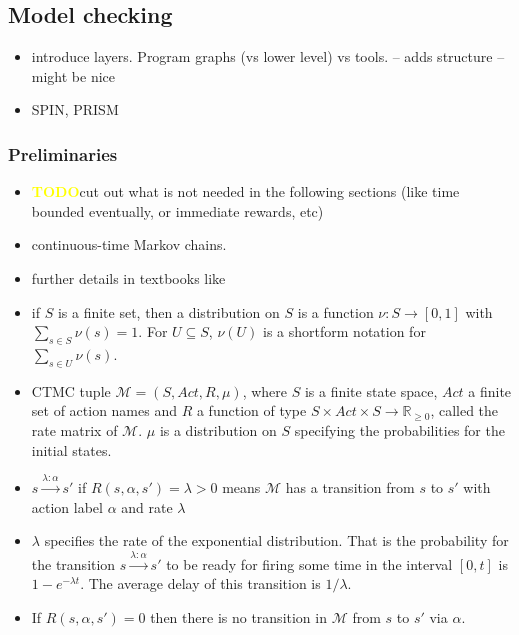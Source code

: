 \documentclass[a4paper, 10pt]{article}
\def \todo{\textbf{\textcolor{yellow}{TODO}}}
\begin{document}
\begin{enumerate}
\subsection{Model checking}
\label{ssec:analysis-modelchecking}
\begin{itemize}
	\item introduce layers. Program graphs (vs lower level) vs tools. -- adds structure -- might be nice
	\item SPIN\cite{spin, hol97}, PRISM\cite{prism, knp09}
\end{itemize}

\subsubsection{Preliminaries}
\label{sssec:analysis-modelchecking-preliminaries}
\begin{itemize}
	\item \todo cut out what is not needed in the following sections (like time bounded eventually, or immediate rewards, etc)
	\item continuous-time Markov chains.
	\item further details in textbooks like \cite{kul95, ks76}
	\item if $S$ is a finite set, then a distribution on $S$ is a function $\nu:S \rightarrow [0,1]$ with $\sum\limits_{s \in S} \nu (s) = 1$. For $U \subseteq S$, $\nu (U)$ is a shortform notation for $\sum\limits_{s \in U} \nu (s)$.
	\item CTMC tuple $\mathcal{M} = (S, \mathit{Act}, R, \mu)$, where $S$ is a finite state space, $Act$ a finite set of action names and $R$ a function of type $S \times \mathit{Act} \times S \rightarrow \mathbb{R}_{\ge 0}$, called the rate matrix of $\mathcal{M}$. $\mu$ is a distribution on $S$ specifying the probabilities for the initial states.
	\item $s \xrightarrow{\lambda : \alpha} s'$ if $R(s, \alpha, s') = \lambda > 0$ means $\mathcal{M}$ has a transition from $s$ to $s'$ with action label $\alpha$ and rate $\lambda$
	\item $\lambda$ specifies the rate of the exponential distribution. That is the probability for the transition $s \xrightarrow{\lambda : \alpha} s'$ to be ready for firing some time in the interval $[0,t]$ is $1-e^{- \lambda t}$. The average delay  of this transition is $1 / \lambda$.
	\item If $R(s, \alpha, s') = 0$ then there is no transition in $\mathcal{M}$ from $s$ to $s'$ via $\alpha$.

\end{itemize}
\end{enumerate}
\end{document}
